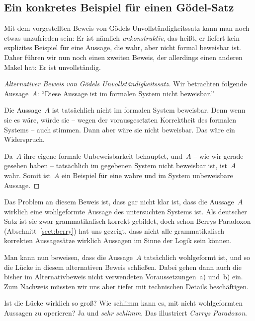 \documentclass[twoside]{../zirkelblatt1415}
\theoremstyle{definition}
\theoremstyle{plain}
\theoremstyle{remark}
\begin{document}
\subsection{Ein konkretes Beispiel für einen Gödel-Satz}

Mit dem vorgestellten Beweis von Gödels Unvollständigkeitssatz kann man noch
etwas unzufrieden sein: Er ist nämlich \emph{unkonstruktiv}, das heißt, er
liefert kein explizites Beispiel für eine Aussage, die wahr, aber nicht formal
beweisbar ist. Daher führen wir nun noch einen zweiten Beweis, der allerdings
einen anderen Makel hat: Er ist unvollständig.

\begin{proof}[Alternativer Beweis von Gödels Unvollständigkeitssatz]
Wir betrachten folgende Aussage~$A$: "`Diese Aussage ist im formalen System nicht
beweisbar."'

Die Aussage~$A$ ist tatsächlich nicht im formalen System beweisbar. Denn wenn
sie es wäre, würde sie -- wegen der vorausgesetzten Korrektheit des formalen
Systems -- auch stimmen. Dann aber wäre sie nicht beweisbar. Das wäre ein
Widerspruch.

Da~$A$ ihre eigene formale Unbeweisbarkeit behauptet, und~$A$ -- wie wir gerade
gesehen haben -- tatsächlich im gegebenen System nicht beweisbar ist, ist~$A$
wahr. Somit ist~$A$ ein Beispiel für eine wahre und im System unbeweisbare
Aussage.
\end{proof}

Das Problem an diesem Beweis ist, dass gar nicht klar ist, dass die Aussage~$A$
wirklich eine wohlgeformte Aussage des untersuchten Systems ist. Als deutscher
Satz ist sie zwar grammatikalisch korrekt gebildet, doch schon Berrys Paradoxon
(Abschnitt~\ref{sect:berry}) hat uns gezeigt, dass nicht alle grammatikalisch
korrekten Aussagesätze wirklich Aussagen im Sinne der Logik sein können.

Man kann nun beweisen, dass die Aussage~$A$ tatsächlich wohlgeformt ist, und so
die Lücke in diesem alternativen Beweis schließen. Dabei gehen dann auch die
bisher im Alternativbeweis nicht verwendeten Voraussetzungen~a) und~b) ein. Zum
Nachweis müssten wir uns aber tiefer mit technischen Details beschäftigen.

Ist die Lücke wirklich so groß? Wie schlimm kann es, mit nicht
wohlgeformten Aussagen zu operieren? Ja und \emph{sehr schlimm}. Das
illustriert \emph{Currys Paradoxon}.
\end{document}
